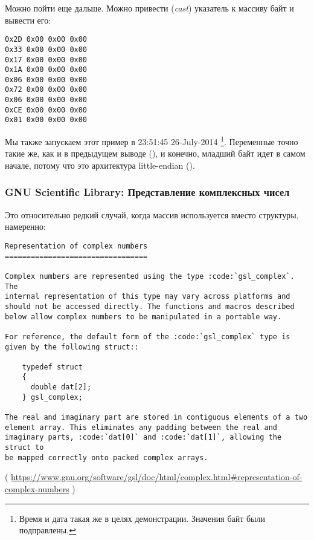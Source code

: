 Можно пойти еще дальше. Можно привести (\emph{cast}) указатель к массиву байт и вывести его:%



\begin{lstlisting}
0x2D 0x00 0x00 0x00 
0x33 0x00 0x00 0x00 
0x17 0x00 0x00 0x00 
0x1A 0x00 0x00 0x00 
0x06 0x00 0x00 0x00 
0x72 0x00 0x00 0x00 
0x06 0x00 0x00 0x00 
0xCE 0x00 0x00 0x00 
0x01 0x00 0x00 0x00 
\end{lstlisting}

Мы также запускаем этот пример в 23:51:45 26-July-2014
\footnote{Время и дата такая же в целях демонстрации. Значения байт были подправлены.}.
Переменные точно такие же, как и в предыдущем выводе 
(), и конечно, младший байт идет в самом начале, потому что это архитектура 
little-endian ().



\subsubsection{GNU Scientific Library: Представление комплексных чисел}

Это относительно редкий случай, когда массив используется вместо структуры, намеренно:

\begin{lstlisting}
Representation of complex numbers
=================================

Complex numbers are represented using the type :code:`gsl_complex`. The
internal representation of this type may vary across platforms and
should not be accessed directly. The functions and macros described
below allow complex numbers to be manipulated in a portable way.

For reference, the default form of the :code:`gsl_complex` type is
given by the following struct::

    typedef struct
    {
      double dat[2];
    } gsl_complex;

The real and imaginary part are stored in contiguous elements of a two
element array. This eliminates any padding between the real and
imaginary parts, :code:`dat[0]` and :code:`dat[1]`, allowing the struct to
be mapped correctly onto packed complex arrays.
\end{lstlisting}
( \url{https://www.gnu.org/software/gsl/doc/html/complex.html#representation-of-complex-numbers} )

